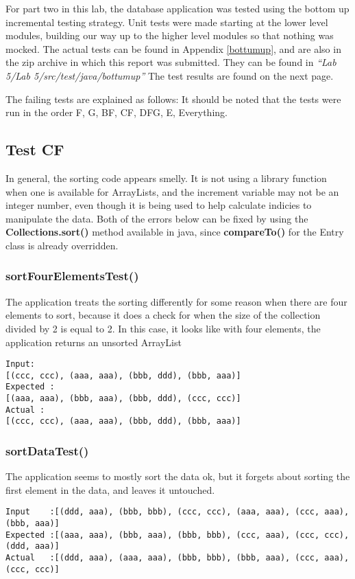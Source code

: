 For part two in this lab, the database application was tested using the bottom
up incremental testing strategy. Unit tests were made starting at the lower
level modules, building our way up to the higher level modules so that nothing
was mocked. The
actual tests can be found in Appendix \ref{bottumup}, and are also in the zip
archive in which this report was submitted. They can be found in
\emph{``Lab 5/Lab 5/src/test/java/bottumup''} The test results are found on the
next page.
%
%

The failing tests are explained as follows:
It should be noted that the tests were run in the order F, G, BF, CF, DFG, E,
Everything.
\subsection{Test CF}
In general, the sorting code appears smelly. It is not using a library function
when one is available for ArrayLists, and the increment variable may not be an
integer number, even though it is being used to help calculate indicies to
manipulate the data. Both of the errors below can be fixed by using the
\textbf{Collections.sort()} method available in java, since \textbf{compareTo()}
for the Entry class is already overridden.
\subsubsection{sortFourElementsTest()}
The application treats the sorting differently for some reason when there are
four elements to sort, because it does a check for when the size of the
collection divided by 2 is equal to 2. In this case, it looks like with four
elements, the application returns an unsorted ArrayList

\begin{verbatim}
Input:
[(ccc, ccc), (aaa, aaa), (bbb, ddd), (bbb, aaa)]
Expected :
[(aaa, aaa), (bbb, aaa), (bbb, ddd), (ccc, ccc)]
Actual :
[(ccc, ccc), (aaa, aaa), (bbb, ddd), (bbb, aaa)]
\end{verbatim}

\subsubsection{sortDataTest()}
The application seems to mostly sort the data ok, but it forgets about sorting
the first element in the data, and leaves it untouched.

\begin{verbatim}
Input    :[(ddd, aaa), (bbb, bbb), (ccc, ccc), (aaa, aaa), (ccc, aaa), (bbb, aaa)]   
Expected :[(aaa, aaa), (bbb, aaa), (bbb, bbb), (ccc, aaa), (ccc, ccc), (ddd, aaa)]
Actual   :[(ddd, aaa), (aaa, aaa), (bbb, bbb), (bbb, aaa), (ccc, aaa), (ccc, ccc)]
\end{verbatim}


